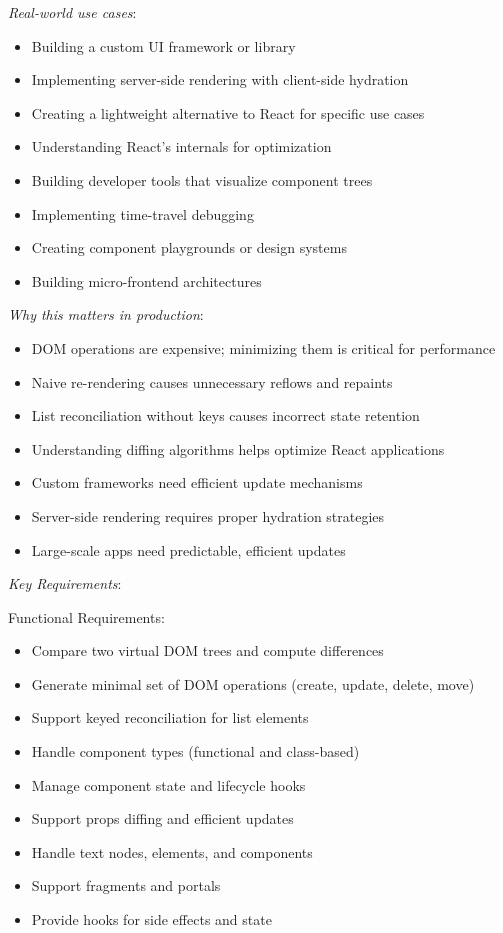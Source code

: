 \documentclass[11pt]{article}
\begin{document}
\emph{Real-world use cases}:

\begin{itemize}
\item Building a custom UI framework or library
\item Implementing server-side rendering with client-side hydration
\item Creating a lightweight alternative to React for specific use cases
\item Understanding React's internals for optimization
\item Building developer tools that visualize component trees
\item Implementing time-travel debugging
\item Creating component playgrounds or design systems
\item Building micro-frontend architectures
\end{itemize}

\emph{Why this matters in production}:

\begin{itemize}
\item DOM operations are expensive; minimizing them is critical for performance
\item Naive re-rendering causes unnecessary reflows and repaints
\item List reconciliation without keys causes incorrect state retention
\item Understanding diffing algorithms helps optimize React applications
\item Custom frameworks need efficient update mechanisms
\item Server-side rendering requires proper hydration strategies
\item Large-scale apps need predictable, efficient updates
\end{itemize}

\emph{Key Requirements}:

Functional Requirements:

\begin{itemize}
\item Compare two virtual DOM trees and compute differences
\item Generate minimal set of DOM operations (create, update, delete, move)
\item Support keyed reconciliation for list elements
\item Handle component types (functional and class-based)
\item Manage component state and lifecycle hooks
\item Support props diffing and efficient updates
\item Handle text nodes, elements, and components
\item Support fragments and portals
\item Provide hooks for side effects and state
\end{itemize}
\end{document}
